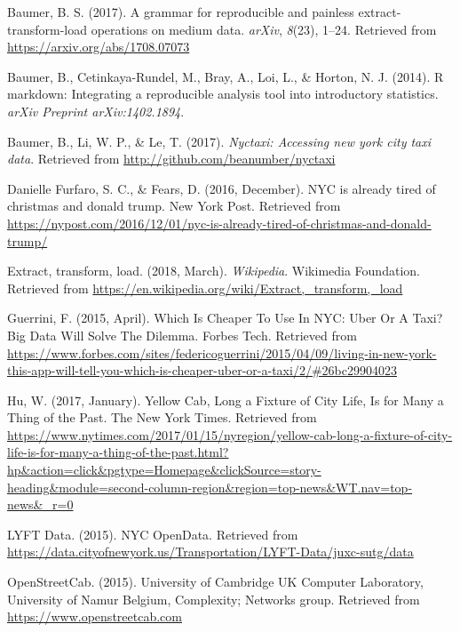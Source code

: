 \documentclass[12pt,twoside]{reedthesis}
\theoremstyle{definition}
\theoremstyle{definition}
\theoremstyle{definition}
\theoremstyle{remark}
\begin{document}

\noindent

\setlength{\parindent}{-0.20in} \setlength{\leftskip}{0.20in}
\setlength{\parskip}{8pt}

\hypertarget{refs}{}
\hypertarget{ref-pkgetl}{}
Baumer, B. S. (2017). A grammar for reproducible and painless
extract-transform-load operations on medium data. \emph{arXiv},
\emph{8}(23), 1--24. Retrieved from
\url{https://arxiv.org/abs/1708.07073}

\hypertarget{ref-baumer2014}{}
Baumer, B., Cetinkaya-Rundel, M., Bray, A., Loi, L., \& Horton, N. J.
(2014). R markdown: Integrating a reproducible analysis tool into
introductory statistics. \emph{arXiv Preprint arXiv:1402.1894}.

\hypertarget{ref-pkgnyctaxi}{}
Baumer, B., Li, W. P., \& Le, T. (2017). \emph{Nyctaxi: Accessing new
york city taxi data}. Retrieved from
\url{http://github.com/beanumber/nyctaxi}

\hypertarget{ref-furfaro2016}{}
Danielle Furfaro, S. C., \& Fears, D. (2016, December). NYC is already
tired of christmas and donald trump. New York Post. Retrieved from
\url{https://nypost.com/2016/12/01/nyc-is-already-tired-of-christmas-and-donald-trump/}

\hypertarget{ref-wikipedia}{}
Extract, transform, load. (2018, March). \emph{Wikipedia}. Wikimedia
Foundation. Retrieved from
\url{https://en.wikipedia.org/wiki/Extract,_transform,_load}

\hypertarget{ref-guerrini2015}{}
Guerrini, F. (2015, April). Which Is Cheaper To Use In NYC: Uber Or A
Taxi? Big Data Will Solve The Dilemma. Forbes Tech. Retrieved from
\url{https://www.forbes.com/sites/federicoguerrini/2015/04/09/living-in-new-york-this-app-will-tell-you-which-is-cheaper-uber-or-a-taxi/2/\#26bc29904023}

\hypertarget{ref-hu2017}{}
Hu, W. (2017, January). Yellow Cab, Long a Fixture of City Life, Is for
Many a Thing of the Past. The New York Times. Retrieved from
\url{https://www.nytimes.com/2017/01/15/nyregion/yellow-cab-long-a-fixture-of-city-life-is-for-many-a-thing-of-the-past.html?hp\&action=click\&pgtype=Homepage\&clickSource=story-heading\&module=second-column-region\&region=top-news\&WT.nav=top-news\&_r=0}

\hypertarget{ref-datalyft}{}
LYFT Data. (2015). NYC OpenData. Retrieved from
\url{https://data.cityofnewyork.us/Transportation/LYFT-Data/juxc-sutg/data}

\hypertarget{ref-appone}{}
OpenStreetCab. (2015). University of Cambridge UK Computer Laboratory,
University of Namur Belgium, Complexity; Networks group. Retrieved from
\url{https://www.openstreetcab.com}
\end{document}
